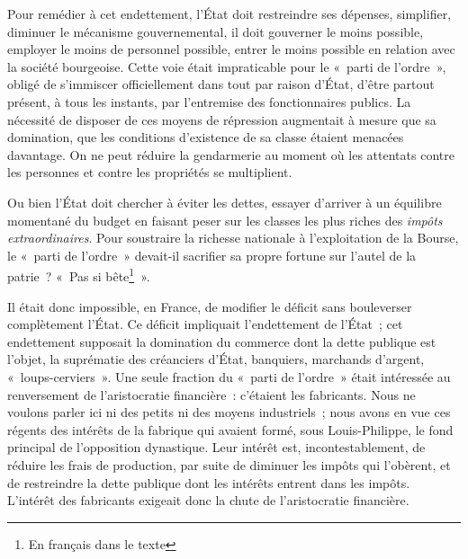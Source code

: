 \documentclass[french,twoside]{book} %
\begin{document}
Pour remédier à cet endettement, l’État doit restreindre ses dépenses, simplifier, diminuer le mécanisme gouvernemental, il doit gouverner le moins possible, employer le moins de personnel possible, entrer le moins possible en relation avec la société bourgeoise. Cette voie était impraticable pour le « parti de l’ordre », obligé de s’immiscer officiellement dans tout par raison d’État, d’être partout présent, à tous les instants, par l’entremise des fonctionnaires publics. La nécessité de disposer de ces moyens de répression augmentait à mesure que sa domination, que les conditions d’existence de sa classe étaient menacées davantage. On ne peut réduire la gendarmerie au moment où les attentats contre les personnes et contre les propriétés se multiplient.\par
Ou bien l’État doit chercher à éviter les dettes, essayer d’arriver à un équilibre momentané du budget en faisant peser sur les classes les plus riches des \emph{impôts extraordinaires}. Pour soustraire la richesse nationale à l’exploitation de la Bourse, le « parti de l’ordre » devait-il sacrifier sa propre fortune sur l’autel de la patrie ? « Pas si bête\footnote{En français dans le texte} ».\par
Il était donc impossible, en France, de modifier le déficit sans bouleverser complètement l’État. Ce déficit impliquait l’endettement de l’État ; cet endettement supposait la domination du commerce dont la dette publique est l’objet, la suprématie des créanciers d’État, banquiers, marchands d’argent, « loups-cerviers ». Une seule fraction du « parti de l’ordre » était intéressée au renversement de l’aristocratie financière : c’étaient les fabricants. Nous ne voulons parler ici ni des petits ni des moyens industriels ; nous avons en vue ces régents des intérêts de la fabrique qui avaient formé, sous Louis-Philippe, le fond principal de l’opposition dynastique. Leur intérêt est, incontestablement, de réduire les frais de production, par suite de diminuer les impôts qui l’obèrent, et de restreindre la dette publique dont les intérêts entrent dans les impôts. L’intérêt des fabricants exigeait donc la chute de l’aristocratie financière.\par
\end{document}
